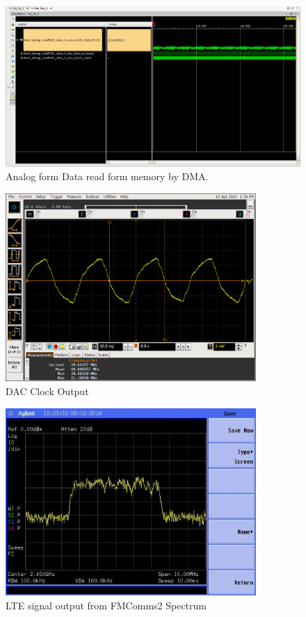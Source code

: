 \begin{figure}[htbp]
    \centering
    \includegraphics[width=1\textwidth,
    trim={{.11\textwidth} {.95\textwidth} {.04\textwidth} {.15\textwidth}},
    clip]{./figures/ltedac_ila}
    \caption{ Analog form Data read form memory by DMA.
    \label{fig:dataflowana}}
\end{figure}

\begin{figure}[htbp]
    \centering
    \includegraphics[width=0.85\textwidth]{./figures/oscill_ad9361_dac_clk}
    \caption{ DAC Clock Output
    \label{fig:dacclk}}
\end{figure}

\begin{figure}[htbp]
    \centering
    \includegraphics[width=0.85\textwidth]{./figures/lte_5m}
    \caption{ LTE signal output from FMComms2 Spectrum
    \label{fig:lte5m}}
\end{figure}

